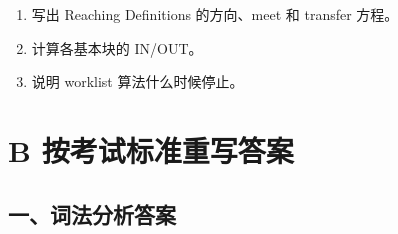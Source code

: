 \documentclass[UTF8,zihao=-4]{ctexart}
\begin{document}
\begin{enumerate}
\item 写出 Reaching Definitions 的方向、meet 和 transfer 方程。
\item 计算各基本块的 IN/OUT。
\item 说明 worklist 算法什么时候停止。

\end{enumerate}

\section{B 按考试标准重写答案}


\subsection{一、词法分析答案}
\end{document}
